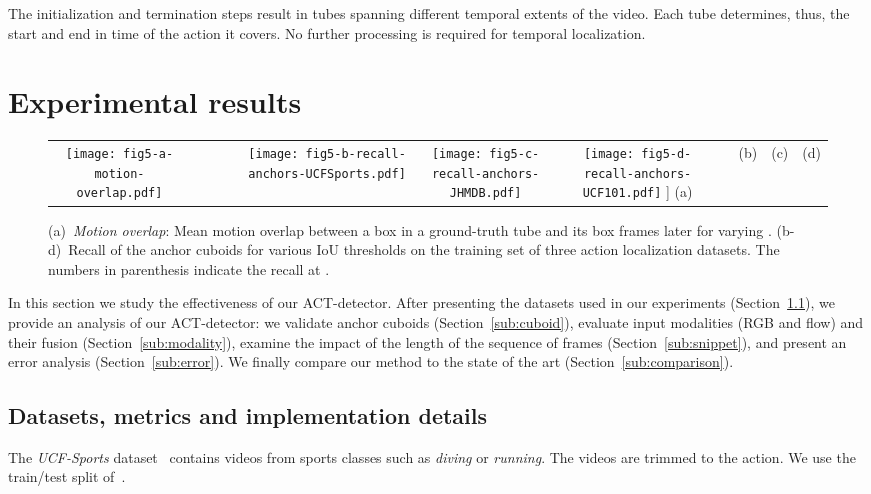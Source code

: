 \documentclass[10pt,twocolumn,letterpaper]{article}
\begin{document}
The initialization and termination steps result in tubes spanning different temporal extents of the video. 
Each tube determines, thus, the start and end in time of the action it covers. No further processing is required for temporal localization. \section{Experimental results}
\label{sec:experiments}

\begin{figure*}[t]
\centering
\begin{tabular}{c@{}c@{}c@{}c@{}c@{}}
\texttt{[image: fig5-a-motion-overlap.pdf]}&
\textit{ ~~~~~} &
\texttt{[image: fig5-b-recall-anchors-UCFSports.pdf]} &
\texttt{[image: fig5-c-recall-anchors-JHMDB.pdf]} & 
\texttt{[image: fig5-d-recall-anchors-UCF101.pdf]} \-1mm]
(a) & & (b) & (c) & (d) 
\end{tabular}
\vspace{-0mm}
\caption{(a)~\textit{Motion overlap}: Mean motion overlap between a box in a ground-truth tube and its box  frames later for varying . (b-d)~Recall of the anchor cuboids for various IoU thresholds on the training set of three action localization datasets. The numbers in parenthesis indicate the recall at . }
\label{fig:cuboids}
\vspace{-5mm}
\end{figure*} 

In this section we study the effectiveness of our ACT-detector.
After presenting the datasets used in our experiments (Section~\ref{sub:datasets}), we provide an analysis of our ACT-detector:  
we validate anchor cuboids (Section~\ref{sub:cuboid}), evaluate input modalities (RGB and flow) and their fusion (Section~\ref{sub:modality}),  
examine the impact of the length  of the sequence of frames (Section~\ref{sub:snippet}), 
and present an error analysis (Section~\ref{sub:error}). 
We finally compare our method to the state of the art (Section~\ref{sub:comparison}).   

\subsection{Datasets, metrics and implementation details}
\label{sub:datasets}

The \textit{UCF-Sports} dataset~\cite{ucfsports} contains  videos from  sports classes such as \textit{diving} or \textit{running}. 
The videos are trimmed to the action. We use the train/test split of~\cite{lan11iccv}. 
\end{document}
